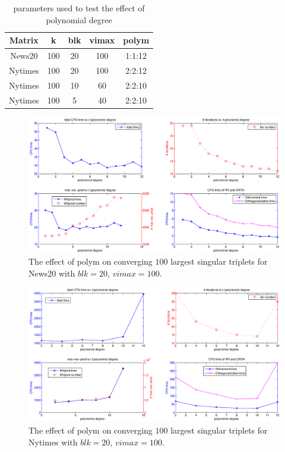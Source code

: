 \documentclass[11pt]{article}
\numberwithin{equation}{section}
\numberwithin{figure}{section}
\numberwithin{table}{section}
\begin{document}
\begin{table}
\begin{center}
\begin{tabular}{|c|c|c|c|c|}
\hline
Matrix & k & blk & vimax & polym \\
\hline
News20 & 100 & 20 & 100 & 1:1:12\\
\hline
Nytimes & 100 & 20 & 100 & 2:2:12\\
\hline
Nytimes & 100 & 10 & 60 & 2:2:10\\
\hline
Nytimes & 100 & 5 & 40 & 2:2:10\\
\hline
\end{tabular}
\end{center}
\caption{parameters used to test the effect of polynomial degree}
\label{effect_polym}
\end{table}

\begin{figure}
\centering
\includegraphics[scale=0.5]{news20_polym_blk20_v100.eps}
\caption{The effect of polym on converging $100$ largest singular triplets for News20 with $blk = 20$, $vimax = 100$.}
\label{news20_polym}
\end{figure}

\begin{figure}
\centering
\includegraphics[scale=0.5]{nytimes_polym_blk20_v100.eps}
\caption{The effect of polym on converging $100$ largest singular triplets for Nytimes with $blk = 20$, $vimax = 100$.}
\label{nytimes_polym1}
\end{figure}
\end{document}
